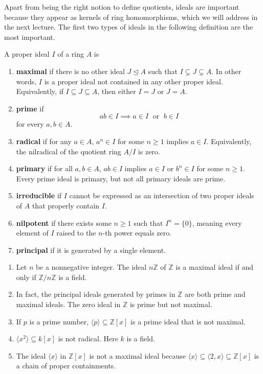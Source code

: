 \documentclass[11pt,a4paper]{article}
\begin{document}
Apart from being the right notion to define quotients, ideals are important because they 
appear as kernels of ring homomorphisms, which we will address in the next lecture.
The first two types of ideals in the following definition are the most important.
\begin{defi}
    A proper ideal \(I\) of a ring \(A\) is 
    \begin{enumerate}[label=(\roman*)]
        \item \textbf{maximal} if there is no other ideal \(J \trianglelefteq A\) such that \(I\subsetneq J \subsetneq A\). In other words, \(I\) is a proper ideal not contained in any other proper ideal. Equivalently, if \(I\subseteq J\subseteq A\), then either \(I=J\) or \(J=A\).
        \item \textbf{prime} if 
        \[ab\in I \implies a\in I\;\text{ or }\; b\in I\] for every \(a,b\in A\).
        \item \textbf{radical} if for any \(a \in A\), \(a^n \in I\) for some \(n \geq 1\) implies \(a \in I\). Equivalently, the nilradical of the quotient ring \(A/I\) is zero.
        \item \textbf{primary} if for all \(a, b \in A\), \(ab \in I\) implies \(a \in I\) or \(b^n \in I\) for some \(n \geq 1\). Every prime ideal is primary, but not all primary ideals are prime.
        \item \textbf{irreducible} if \(I\) cannot be expressed as an intersection of two proper ideals of \(A\) that properly contain \(I\).
        \item \textbf{nilpotent} if there exists some \(n \geq 1\) such that \(I^n = \{0\}\), meaning every element of \(I\) raised to the \(n\)-th power equals zero.
        \item \textbf{principal} if it is generated by a single element.
    \end{enumerate}
\end{defi}

\begin{exa}
\begin{enumerate}[label=(\roman*)]
\item Let $n$ be a nonnegative integer. The ideal $n \mathbb{Z}$ of $\mathbb{Z}$ is a maximal ideal if and only if $\mathbb{Z} / n \mathbb{Z}$ is a field. 

\item In fact, the principal ideals generated by primes in $\mathbb{Z}$ are both prime and maximal ideals. The zero ideal in $\mathbb{Z}$ is prime but not maximal.
\item If \(p\) is a prime number,  \(\langle p \rangle \subseteq \mathbb{Z}[x]\) is a prime ideal that is not  maximal.
\item  \(\langle x^2 \rangle \subseteq k[x]\) is not radical. Here \(k\) is a field.
\item The ideal $\langle x\rangle$ in $\mathbb{Z}[x]$ is not a maximal ideal because $\langle x\rangle \subseteq\langle 2, x\rangle \subseteq \mathbb{Z}[x]$ is a chain of proper containments.
\end{enumerate}
\end{exa}
\end{document}
